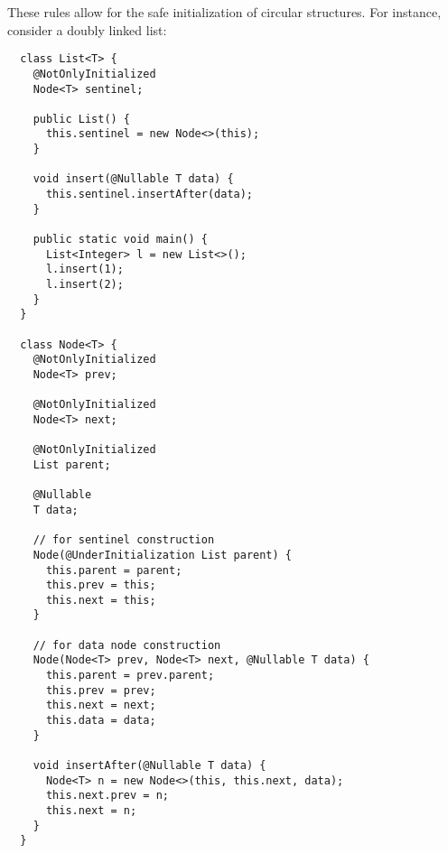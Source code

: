 These rules allow for the safe initialization of circular structures.  For instance,
consider a doubly linked list:

\begin{Verbatim}
  class List<T> {
    @NotOnlyInitialized
    Node<T> sentinel;

    public List() {
      this.sentinel = new Node<>(this);
    }

    void insert(@Nullable T data) {
      this.sentinel.insertAfter(data);
    }

    public static void main() {
      List<Integer> l = new List<>();
      l.insert(1);
      l.insert(2);
    }
  }

  class Node<T> {
    @NotOnlyInitialized
    Node<T> prev;

    @NotOnlyInitialized
    Node<T> next;

    @NotOnlyInitialized
    List parent;

    @Nullable
    T data;

    // for sentinel construction
    Node(@UnderInitialization List parent) {
      this.parent = parent;
      this.prev = this;
      this.next = this;
    }

    // for data node construction
    Node(Node<T> prev, Node<T> next, @Nullable T data) {
      this.parent = prev.parent;
      this.prev = prev;
      this.next = next;
      this.data = data;
    }

    void insertAfter(@Nullable T data) {
      Node<T> n = new Node<>(this, this.next, data);
      this.next.prev = n;
      this.next = n;
    }
  }
\end{Verbatim}

